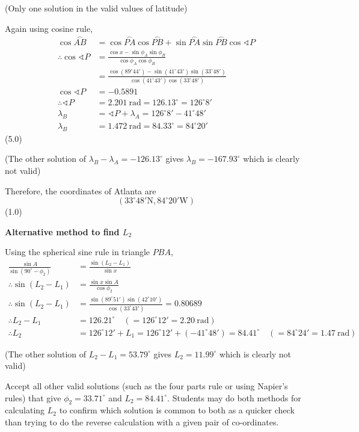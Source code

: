 (Only one solution in the valid values of latitude)

Again using cosine rule,
\begin{align*}
  \cos\overset{\frown}{AB}
    &= \cos\overset{\frown}{PA}\cos\overset{\frown}{PB}
     + \sin\overset{\frown}{PA}\sin\overset{\frown}{PB}
       \cos\sphericalangle P\\
  \therefore \cos\sphericalangle P
    &= \frac{\cos x - \sin\phi_A \sin\phi_B}{\cos\phi_A \cos\phi_B}\\
    &= \frac{\cos(89^\circ 44') - \sin(41^\circ 43')\sin(33^\circ 48')}
            {\cos(41^\circ 43')\cos(33^\circ 48')}\\
  \cos\sphericalangle P &= -0.5891\\
  \therefore \sphericalangle P
    &= 2.201\ \mathrm{rad} = 126.13^\circ = 126^\circ 8'\\
  \lambda_B &= \sphericalangle P + \lambda_A = 126^\circ 8' - 41^\circ 48'\\
  \lambda_B &= 1.472\ \mathrm{rad} = 84.33^\circ = 84^\circ 20'
\end{align*}
\hfill(5.0)

(The other solution of $\lambda_B - \lambda_A = -126.13^\circ$ gives
$\lambda_B = -167.93^\circ$ which is clearly not valid)

Therefore, the coordinates of Atlanta are
\[
  (33^\circ 48'\mathrm{N}, 84^\circ 20'\mathrm{W})
\]
\hfill(1.0)

\medskip
\noindent\textbf{Alternative method to find $L_2$}

Using the spherical sine rule in triangle $PBA$,
\begin{align*}
  \frac{\sin A}{\sin(90^\circ - \phi_2)}
    &= \frac{\sin(L_2 - L_1)}{\sin x}\\
  \therefore \sin(L_2 - L_1) &= \frac{\sin x \sin A}{\cos\phi_2}\\
  \therefore \sin(L_2 - L_1)
    &= \frac{\sin(89^\circ 51')\sin(42^\circ 10')}{\cos(33^\circ 43')}
     = 0.80689\\
  \therefore L_2 - L_1
    &= 126.21^\circ \quad (= 126^\circ 12' = 2.20\ \mathrm{rad})\\
  \therefore L_2 &= 126^\circ 12' + L_1
    = 126^\circ 12' + (-41^\circ 48') = 84.41^\circ
    \quad (= 84^\circ 24' = 1.47\ \mathrm{rad})
\end{align*}

(The other solution of $L_2 - L_1 = 53.79^\circ$ gives $L_2 = 11.99^\circ$
which is clearly not valid)

Accept all other valid solutions (such as the four parts rule or using
Napier's rules) that give $\phi_2 = 33.71^\circ$ and $L_2 = 84.41^\circ$.
Students may do both methods for calculating $L_2$ to confirm which solution
is common to both as a quicker check than trying to do the reverse calculation
with a given pair of co-ordinates.
